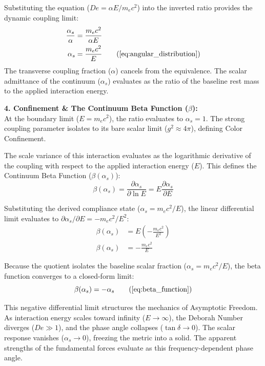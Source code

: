 Substituting the equation ($De = \alpha E / m_e c^2$) into the inverted ratio provides the dynamic coupling limit:
\begin{align}
    \frac{\alpha_s}{\alpha} &= \frac{m_e c^2}{\alpha E} \\
    \alpha_s &= \frac{m_e c^2}{E} \tag{\ref{eq:angular_distribution}} 
\end{align}
The transverse coupling fraction ($\alpha$) cancels from the equivalence. The scalar admittance of the continuum ($\alpha_s$) evaluates as the ratio of the baseline rest mass to the applied interaction energy. 

\vspace{0.2 cm}

\textbf{4. Confinement \& The Continuum Beta Function ($\beta$):} \\ 
At the boundary limit ($E = m_e c^2$), the ratio evaluates to $\alpha_s = 1$. The strong coupling parameter isolates to its bare scalar limit ($g^2 \approx 4\pi$), defining Color Confinement.  

The scale variance of this interaction evaluates as the logarithmic derivative of the coupling with respect to the applied interaction energy ($E$). This defines the Continuum Beta Function ($\beta(\alpha_s)$): 
\begin{equation}
    \beta(\alpha_s) = \frac{\partial \alpha_s}{\partial \ln E} = E \frac{\partial \alpha_s}{\partial E}
\end{equation}

Substituting the derived compliance state ($\alpha_s = m_e c^2 / E$), the linear differential limit evaluates to $\partial \alpha_s / \partial E = - m_e c^2 / E^2$:
\begin{align}
    \beta(\alpha_s) &= E \left( - \frac{m_e c^2}{E^2} \right) \\ 
    \beta(\alpha_s) &= - \frac{m_e c^2}{E}
\end{align}

Because the quotient isolates the baseline scalar fraction ($\alpha_s = m_e c^2 / E$), the beta function converges to a closed-form limit: 
\begin{equation}
    \beta(\alpha_s) = - \alpha_s \tag{\ref{eq:beta_function}}
\end{equation}

This negative differential limit structures the mechanics of Asymptotic Freedom. As interaction energy scales toward infinity ($E \to \infty$), the Deborah Number diverges ($De \gg 1$), and the phase angle collapses ($\tan \delta \to 0$). The scalar response vanishes ($\alpha_s \to 0$), freezing the metric into a solid. The apparent strengths of the fundamental forces evaluate as this frequency-dependent phase angle. 

